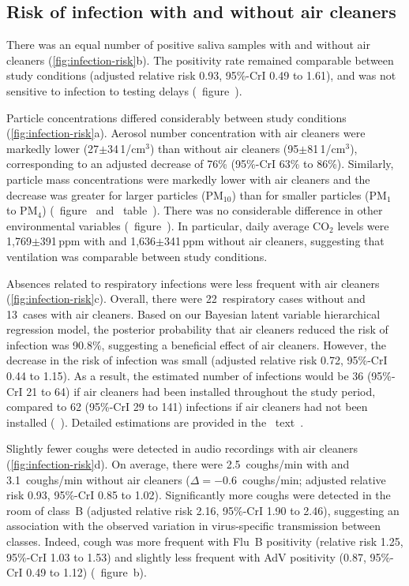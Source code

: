 \documentclass[fleqn,11pt]{wlscirep}
\begin{document}
\subsection{Risk of infection with and without air cleaners}

There was an equal number of positive saliva samples with and without air cleaners (\cref{fig:infection-risk}b). The positivity rate remained comparable between study conditions (adjusted relative risk 0.93, 95\%-CrI 0.49 to 1.61), and was not sensitive to infection to testing delays (\supp~figure~).

Particle concentrations differed considerably between study conditions (\cref{fig:infection-risk}a). Aerosol number concentration with air cleaners were markedly lower (27$\pm$34\,1/cm$^3$) than without air cleaners (95$\pm$81\,1/cm$^3$), corresponding to an adjusted decrease of 76\% (95\%-CrI 63\% to 86\%). Similarly, particle mass concentrations were markedly lower with air cleaners and the decrease was greater for larger particles (PM$_{10}$) than for smaller particles (PM$_1$ to PM$_{4}$) (\supp~figure~ and \supp~table~). There was no considerable difference in other environmental variables (\supp~figure~). In particular, daily average CO$_2$ levels were 1,769$\pm$391\,ppm with and 1,636$\pm$341\,ppm without air cleaners, suggesting that ventilation was comparable between study conditions.

Absences related to respiratory infections were less frequent with air cleaners (\cref{fig:infection-risk}c). Overall, there were 22~respiratory cases without and 13~cases with air cleaners. Based on our Bayesian latent variable hierarchical regression model, the posterior probability that air cleaners reduced the risk of infection was 90.8\%, suggesting a beneficial effect of air cleaners. However, the decrease in the risk of infection was small (adjusted relative risk 0.72, 95\%-CrI 0.44 to 1.15). As a result, the estimated number of infections would be 36 (95\%-CrI 21 to 64) if air cleaners had been installed throughout the study period, compared to 62 (95\%-CrI 29 to 141) infections if air cleaners had not been installed (\supp~). Detailed estimations are provided in the \supp~text~. 

Slightly fewer coughs were detected in audio recordings with air cleaners (\cref{fig:infection-risk}d). On average, there were 2.5~coughs/min with and 3.1~coughs/min without air cleaners ($\Delta=-$0.6~coughs/min; adjusted relative risk 0.93, 95\%-CrI 0.85 to 1.02). Significantly more coughs were detected in the room of class~B (adjusted relative risk 2.16, 95\%-CrI 1.90 to 2.46), suggesting an association with the observed variation in virus-specific transmission between classes. Indeed, cough was more frequent with Flu~B positivity (relative risk 1.25, 95\%-CrI 1.03 to 1.53) and slightly less frequent with AdV positivity (0.87, 95\%-CrI 0.49 to 1.12) (\supp~figure~b). 
\end{document}
